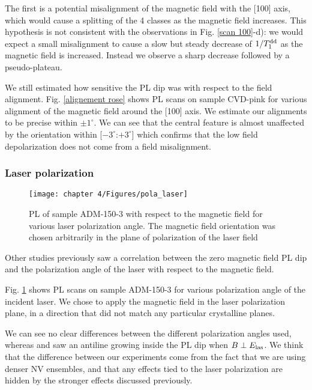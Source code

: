 \documentclass[a4paper,11pt]{report}
\begin{document}
\begin{refsection}
The first is a potential misalignment of the magnetic field with the [100] axis, which would cause a splitting of the 4 classes as the magnetic field increases. This hypothesis is not consistent with the observations in Fig. \ref{scan 100}-d): we would expect a small  misalignment to cause a slow but steady decrease of $1/T_1^{\rm dd}$ as the magnetic field is increased. Instead we observe a sharp decrease followed by a pseudo-plateau.

We still estimated how sensitive the PL dip was with respect to the field alignment. Fig. \ref{alignement rose} shows PL scans on sample CVD-pink for various alignment of the magnetic field around the [100] axis. We estimate our alignments to be precise within $\pm 1^\circ$. We can see that the central feature is almost unaffected by the orientation within [$-3^\circ$:$+3^\circ$] which confirms that the low field depolarization does not come from a field misalignment.

\subsubsection{Laser polarization}
\begin{figure}[h]
\centering
\texttt{[image: chapter 4/Figures/pola\_laser]}
\caption{PL of sample ADM-150-3 with respect to the magnetic field for various laser polarization angle. The magnetic field orientation was chosen arbitrarily in the plane of polarization of the laser field}
\label{pola laser}
\end{figure}

Other studies \citep{anishchik2015low, filimonenko2020weak} previously saw a correlation between the zero magnetic field PL dip and the polarization angle of the laser with respect to the magnetic field. 

Fig. \ref{pola laser} shows PL scans on sample ADM-150-3 for various polarization angle of the incident laser. We chose to apply the magnetic field in the laser polarization plane, in a direction that did not match any particular crystalline planes.

We can see no clear differences between the different polarization angles used, whereas \citep{anishchik2015low} and \citep{filimonenko2020weak} saw an antiline growing inside the PL dip when $B \perp E_{\rm las}$. We think that the difference between our experiments come from the fact that we are using denser NV ensembles, and that any effects tied to the laser polarization are hidden by the stronger effects discussed previously.



\end{refsection}
\end{document}
